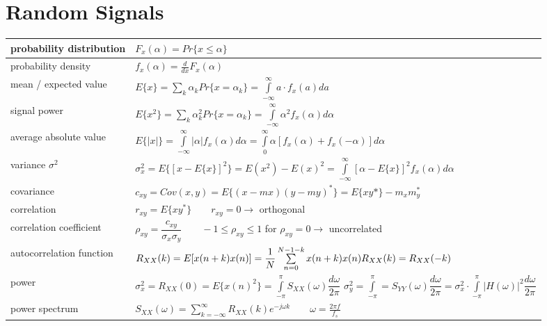 \section{Random Signals}
\begin{tabularx}{\linewidth}{|l|X|}
	\hline
	probability distribution & $F_x(\alpha) = Pr\{x \leq \alpha \}$ \\
	\hline
	probability density & $f_x(\alpha) = \frac{d}{dx}F_x(\alpha)$\\
	\hline
	mean / expected value & $E\{x\} = \sum\limits_k \alpha_k Pr\{x = \alpha_k\} =
	\int\limits_{-\infty}^{\infty}a\cdot f_x(a)da$
	\\
	\hline
	signal power & $E\{ x^2 \} = \sum\limits_k \alpha_k^2 Pr\{x = \alpha_k\} =
	\int\limits_{-\infty}^{\infty} \alpha^2 f_x(\alpha) d\alpha$ \\
	\hline
	average absolute value & $E\{ |x| \} = \int\limits_{-\infty}^{\infty} |\alpha| f_x(\alpha) d\alpha 
										 = \int\limits_{0}^{\infty} \alpha[f_x(\alpha) + f_x(-\alpha)] d\alpha $
	\\ \hline
	variance $\sigma^2$ & 
	$\sigma_x^2 = E\{ [x-E\{ x \}]^2 \} = E(x^2) - E(x)^2 = 
	\int\limits_{-\infty}^{\infty}[\alpha - E\{ x \}]^2 f_x(\alpha) d\alpha $
	\\ \hline
	covariance &
	$c_{xy} = Cov(x,y) = E\{(x-mx)(y-my)^*\} = E\{xy*\} - m_xm_y^*$
	\\ \hline
  correlation &
  $r_{xy} = E\{xy^*\}  \qquad r_{xy} = 0 \rightarrow$ orthogonal
	\\ \hline
  correlation coefficient &
  $\rho_{xy} = \dfrac{c_{xy}}{\sigma_x\sigma_y} \qquad -1\leq \rho_{xy} \leq 1$ \newline
  for $\rho_{xy} = 0 \rightarrow$ uncorrelated
	\\ \hline
	autocorrelation function & 
	$R_{XX}(k) = E[x(n+k)x(n)]	= \dfrac{1}{N}\sum\limits_{n=0}^{N-1-k} x(n+k)x(n) \newline
	R_{XX}(k) = R_{XX}(-k)$
	\\ \hline
  power &
  $\sigma_x^2 = R_{XX}(0) = E\{x(n)^2\} = \int\limits_{-\pi}^\pi S_{XX}(\omega)\dfrac{d\omega}{2\pi}$ \newline
  $\sigma_y^2 = \int\limits_{-\pi}^\pi = S_{YY}(\omega)\dfrac{d\omega}{2\pi} = 
  \sigma_x^2 \cdot \int\limits_{-\pi}^\pi |H(\omega)|^2 \dfrac{d\omega}{2\pi}$
	\\ \hline
	power spectrum & 
	$S_{XX}(\omega) = \sum\limits_{k=-\infty}^{\infty} R_{XX}(k)e^{-j\omega k} 
  \qquad \omega = \frac{2\pi f}{f_s} $ \newline

\end{tabularx}
